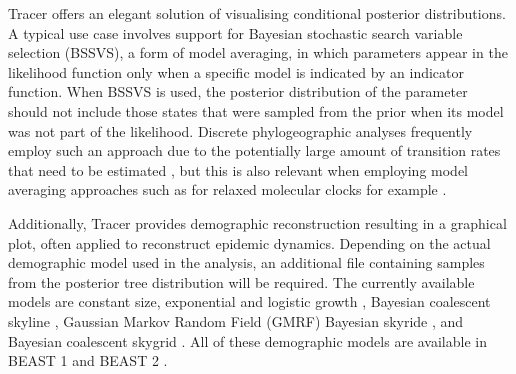 \documentclass{bioinfo}
\begin{document}
Tracer offers an elegant solution of visualising conditional posterior distributions. 
A typical use case involves support for Bayesian stochastic search variable selection (BSSVS), a form of model averaging, in which parameters appear in the likelihood function only when a specific model is indicated by an indicator function.
When BSSVS is used, the posterior distribution of the parameter should not include those states that were sampled from the prior when its model was not part of the likelihood.
Discrete phylogeographic analyses frequently employ such an approach due to the potentially large amount of transition rates that need to be estimated \citep{Lemey2009}, but this is also relevant when employing model averaging approaches such as for relaxed molecular clocks for example \citep{Li2012}.

Additionally, Tracer provides demographic reconstruction resulting in a graphical plot, often applied to reconstruct epidemic dynamics.
Depending on the actual demographic model used in the analysis, an additional file containing samples from the posterior tree distribution will be required.
The currently available models are constant size, exponential and logistic growth \citep{drummond2002estimating}, Bayesian coalescent skyline \citep{drummond2005bayesian}, Gaussian Markov Random Field (GMRF) Bayesian skyride \citep{minin2008smooth}, and Bayesian coalescent skygrid \citep{gill2012improving}.
All of these demographic models are available in BEAST 1 \citep{drummond2012bayesian} and BEAST 2 \citep{bouckaert2014beast2}.
\end{document}
